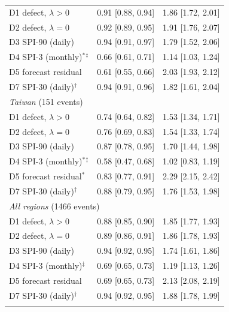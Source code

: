 \begin{table}[tbp]
\begin{tabular*}{\textwidth}{@{\extracolsep\fill}lcc}
\quad D1 defect, $\lambda>0$ & 0.91 [0.88, 0.94] & 1.86 [1.72, 2.01] \\
\quad D2 defect, $\lambda=0$ & 0.92 [0.89, 0.95] & 1.91 [1.76, 2.07] \\
\quad D3 SPI-90 (daily) & 0.94 [0.91, 0.97] & 1.79 [1.52, 2.06] \\
\quad D4 SPI-3 (monthly)$^{\ast}$$^{\ddagger}$ & 0.66 [0.61, 0.71] & 1.14 [1.03, 1.24] \\
\quad D5 forecast residual & 0.61 [0.55, 0.66] & 2.03 [1.93, 2.12] \\
\quad D7 SPI-30 (daily)$^{\dagger}$ & 0.94 [0.91, 0.96] & 1.82 [1.61, 2.04] \\
\midrule
\multicolumn{3}{l}{\textit{Taiwan} (151 events)}\\
\quad D1 defect, $\lambda>0$ & 0.74 [0.64, 0.82] & 1.53 [1.34, 1.71] \\
\quad D2 defect, $\lambda=0$ & 0.76 [0.69, 0.83] & 1.54 [1.33, 1.74] \\
\quad D3 SPI-90 (daily) & 0.87 [0.78, 0.95] & 1.70 [1.44, 1.98] \\
\quad D4 SPI-3 (monthly)$^{\ast}$$^{\ddagger}$ & 0.58 [0.47, 0.68] & 1.02 [0.83, 1.19] \\
\quad D5 forecast residual$^{\ast}$ & 0.83 [0.77, 0.91] & 2.29 [2.15, 2.42] \\
\quad D7 SPI-30 (daily)$^{\dagger}$ & 0.88 [0.79, 0.95] & 1.76 [1.53, 1.98] \\
\midrule
\multicolumn{3}{l}{\textit{All regions} (1466 events)}\\
\quad D1 defect, $\lambda>0$ & 0.88 [0.85, 0.90] & 1.85 [1.77, 1.93] \\
\quad D2 defect, $\lambda=0$ & 0.89 [0.86, 0.91] & 1.86 [1.78, 1.93] \\
\quad D3 SPI-90 (daily) & 0.94 [0.92, 0.95] & 1.74 [1.61, 1.86] \\
\quad D4 SPI-3 (monthly)$^{\ddagger}$ & 0.69 [0.65, 0.73] & 1.19 [1.13, 1.26] \\
\quad D5 forecast residual & 0.69 [0.65, 0.73] & 2.13 [2.08, 2.19] \\
\quad D7 SPI-30 (daily)$^{\dagger}$ & 0.94 [0.92, 0.95] & 1.88 [1.78, 1.99] \\
\botrule
\end{tabular*}
\end{table}
